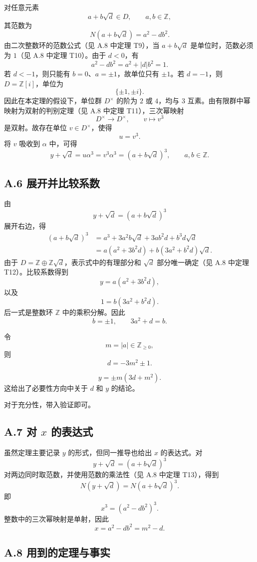 对任意元素
\[
    a+b\sqrt d\in D,
    \qquad a,b\in\mathbb Z,
\]
其范数为
\[
    N(a+b\sqrt d)=a^2-db^2.
\]
由二次整数环的范数公式（见 A.8 中定理 T9），当 \(a+b\sqrt d\) 是单位时，范数必须为 \(1\)（见 A.8 中定理 T10）。由于 \(d<0\)，有
\[
    a^2-db^2=a^2+|d|b^2=1.
\]
若 \(d<-1\)，则只能有 \(b=0\)、\(a=\pm1\)，故单位只有 \(\pm1\)。若 \(d=-1\)，则 \(D=\mathbb Z[i]\)，单位为
\[
    \{\pm1,\pm i\}.
\]
因此在本定理的假设下，单位群 \(D^\times\) 的阶为 \(2\) 或 \(4\)，均与 \(3\) 互素。由有限群中幂映射为双射的判别定理（见 A.8 中定理 T11），三次幂映射
\[
    D^\times\longrightarrow D^\times,
    \qquad
    v\longmapsto v^3
\]
是双射。故存在单位 \(v\in D^\times\)，使得
\[
    u=v^3.
\]
将 \(v\) 吸收到 \(\alpha\) 中，可得
\[
    y+\sqrt d=u\alpha^3 = v^3\alpha^3 =(a+b\sqrt d)^3
    ,
    \qquad a,b\in\mathbb Z.
\]

\subsection*{A.6 展开并比较系数}

由
\[
    y+\sqrt d=(a+b\sqrt d)^3
\]
展开右边，得
\[
\begin{aligned}
    (a+b\sqrt d)^3
    &=a^3+3a^2b\sqrt d+3ab^2d+b^3d\sqrt d \\
    &=a(a^2+3b^2d)+b(3a^2+b^2d)\sqrt d.
\end{aligned}
\]
由于 \(D=\mathbb Z\oplus\mathbb Z\sqrt d\)，表示式中的有理部分和 \(\sqrt d\) 部分唯一确定（见 A.8 中定理 T12）。比较系数得到
\[
    y=a(a^2+3b^2d),
\]
以及
\[
    1=b(3a^2+b^2d).
\]
后一式是整数环 \(\mathbb Z\) 中的乘积分解。因此
\[
    b=\pm1,     \qquad 3a^2+d=b.
\]

令
\[
    m=|a|\in\mathbb Z_{\ge0},
\]
则
\[
    d=-3m^2\pm1.
\]

\[
    y=\pm m(3d+m^2).
\]
这给出了必要性方向中关于 \(d\) 和 \(y\) 的结论。

对于充分性，带入验证即可。

\subsection*{A.7 对 \(x\) 的表达式}

虽然定理主要记录 \(y\) 的形式，但同一推导也给出 \(x\) 的表达式。对
\[
    y+\sqrt d=(a+b\sqrt d)^3
\]
对两边同时取范数，并使用范数的乘法性（见 A.8 中定理 T13），得到
\[
    N(y+\sqrt d)=N(a+b\sqrt d)^3.
\]
即
\[
    x^3=(a^2-db^2)^3.
\]
整数中的三次幂映射是单射，因此
\[
    x=a^2-db^2=m^2-d.
\]

\subsection*{A.8 用到的定理与事实}

